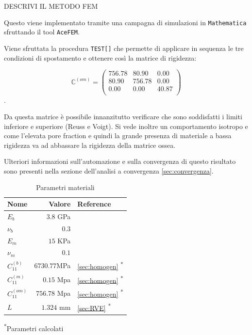 \documentclass[a4paper,num-refs]{oup-contemporary}
\begin{document}
DESCRIVI IL METODO FEM 

Questo viene implementato tramite una campagna di simulazioni in \texttt{Mathematica} sfruttando il tool \texttt{AceFEM}. 

Viene sfruttata la procedura \texttt{TEST[]} che permette di applicare in sequenza le tre condizioni di spostamento e ottenere così la matrice di rigidezza:

\begin{equation}
\mathbb C^{(om)}=\left(
\begin{array}{ccc}
	756.78 & 80.90 & 0.00 \\
	80.90 & 756.78 & 0.00 \\
	0.00 & 0.00 & 40.87\\
\end{array}
\right)
\end{equation}.

Da questa matrice è possibile innanzitutto verificare che sono soddisfatti i limiti inferiore e superiore (Reuss e Voigt). 
Si vede inoltre un comportamento isotropo e come l'elevata pore fraction e quindi la grande presenza di materiale a bassa rigidezza va ad abbassare la rigidezza della matrice ossea. 

Ulteriori informazioni sull'automazione e sulla convergenza di questo risultato sono presenti nella sezione dell'analisi a convergenza \cref{sec:convergenza}.


\begin{table}[bt!]
	\caption{Parametri materiali}\label{tab:example}
	\begin{tabular}{l r l}
		\toprule
		Nome & Valore &  Reference\\
		\midrule
		$E_b$ & $3.8$ GPa & \citet{Cowin1}  \\
		$\nu_b$  & $0.3$ & \citet{Dalstra:93,Wirtz:2000}  \\
		$E_m$  & $15$ KPa  & \citet{Jansen:2015} \\ 
		$\nu_m$ & $0.1 $&    \\
		
		$C_{11}^{(b)}$&$6730.77 $MPa& \cref{sec:homogen} \textsuperscript{*}\\
		$C_{11}^{(m)}$& $0.15$ Mpa& \cref{sec:homogen} \textsuperscript{*}\\
		$C_{11}^{(om)}$& $756.78 $ Mpa & \cref{sec:homogen} \textsuperscript{*}\\
		$L$ & $1.324$ mm& \cref{sec:RVE} \textsuperscript{*}\\
		\bottomrule
	\end{tabular}
	\begin{tablenotes}
		
		\item \textsuperscript{*}Parametri calcolati
	\end{tablenotes}
\end{table}
\end{document}
